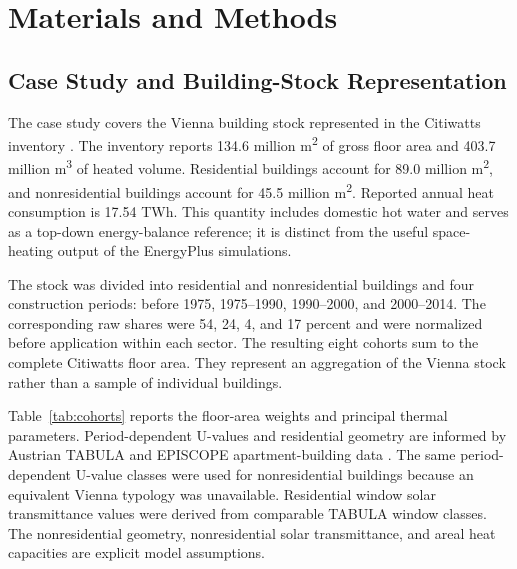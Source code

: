 \documentclass[conference]{IEEEtran}
\begin{document}
\section{Materials and Methods}

\subsection{Case Study and Building-Stock Representation}

The case study covers the Vienna building stock represented in the Citiwatts
inventory \cite{Citiwatts2026}. The inventory reports 134.6 million m\textsuperscript{2}
of gross floor area and 403.7 million m\textsuperscript{3} of heated volume.
Residential buildings account for 89.0 million m\textsuperscript{2}, and
nonresidential buildings account for 45.5 million m\textsuperscript{2}.
Reported annual heat consumption is 17.54 TWh. This quantity includes domestic
hot water and serves as a top-down energy-balance reference; it is distinct
from the useful space-heating output of the EnergyPlus simulations.

The stock was divided into residential and nonresidential buildings and four
construction periods: before 1975, 1975--1990, 1990--2000, and 2000--2014.
The corresponding raw shares were 54, 24, 4, and 17 percent and were normalized
before application within each sector. The resulting eight cohorts sum to the
complete Citiwatts floor area. They represent an aggregation of the Vienna
stock rather than a sample of individual buildings.

Table~\ref{tab:cohorts} reports the floor-area weights and principal thermal
parameters. Period-dependent U-values and residential geometry are informed
by Austrian TABULA and EPISCOPE apartment-building data
\cite{Loga2016,AustrianEnergyAgency2012}. The same
period-dependent U-value classes were used for nonresidential buildings
because an equivalent Vienna typology was unavailable. Residential window
solar transmittance values were derived from comparable TABULA window classes.
The nonresidential geometry, nonresidential solar transmittance, and areal heat
capacities are explicit model assumptions.
\end{document}
